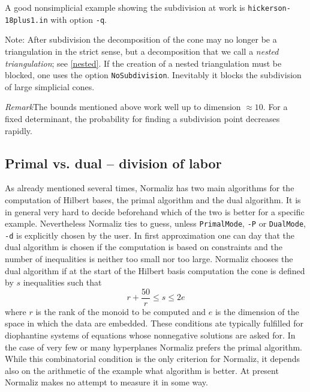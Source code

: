 \documentclass[12pt,a4paper]{scrartcl}
\theoremstyle{definition}
\begin{document}
{A good nonsimplicial example showing the subdivision at work is \verb|hickerson-18plus1.in| with option \verb|-q|.

Note: After subdivision the decomposition of the cone may no longer be a triangulation in the strict sense, but a decomposition that we call a \emph{nested triangulation}; see \ref{nested}. If the creation of a nested triangulation must be blocked, one uses the option \verb|NoSubdivision|. Inevitably it blocks the subdivision of large simplicial cones.

\emph{Remark}\enspace The bounds mentioned above work well up to dimension $\approx 10$. For a fixed determinant, the probability for finding a subdivision point decreases rapidly.

\subsection{Primal vs. dual -- division of labor}\label{div_labor}


As already mentioned several times, Normaliz has two main algorithms for the computation of Hilbert bases, the primal algorithm and the dual algorithm. It is in general very hard to decide beforehand which of the two is better for a specific example. Nevertheless Normaliz ties to guess, unless \verb|PrimalMode|, \verb|-P| or \verb|DualMode|, \verb|-d| is explicitly chosen by the user. In first approximation one can day that the dual algorithm is chosen if the computation is based on constraints and the number of inequalities is neither too small nor too large. Normaliz chooses the dual algorithm if at the start of the Hilbert basis computation the cone is defined by $s$ inequalities such that
$$
r+\frac{50}{r} \le s \le 2e
$$
where $r$ is the rank of the monoid to be computed and $e$ is the dimension of the space in which the data are embedded. These conditions ate typically fulfilled for diophantine systems of equations whose nonnegative solutions are asked for. 
In the case of very few or many hyperplanes Normaliz prefers the primal algorithm. While this combinatorial condition is the only criterion for Normaliz, it depends also on the arithmetic of the example what algorithm is better. At present Normaliz makes no attempt to measure it in some way.

}
\end{document}
